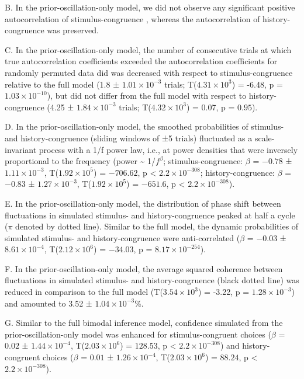 \documentclass[
]{article}
\begin{document}
\begin{itemize}
B. In the prior-oscillation-only model, we did not observe any
significant positive autocorrelation of stimulus-congruence , whereas
the autocorrelation of history-congruence was preserved.

C. In the prior-oscillation-only model, the number of consecutive trials
at which true autocorrelation coefficients exceeded the autocorrelation
coefficients for randomly permuted data did was decreased with respect
to stimulus-congruence relative to the full model (1.8 ±
\ensuremath{1.01\times 10^{-3}} trials;
T(\ensuremath{4.31\times 10^{3}}) = -6.48, p =
\(\ensuremath{1.03\times 10^{-10}}\)), but did not differ from the full
model with respect to history-congruence (4.25 ±
\ensuremath{1.84\times 10^{-3}} trials;
T(\ensuremath{4.32\times 10^{3}}) = 0.07, p = \(0.95\)).

D. In the prior-oscillation-only model, the smoothed probabilities of
stimulus- and history-congruence (sliding windows of ±5 trials)
fluctuated as a scale-invariant process with a 1/f power law, i.e., at
power densities that were inversely proportional to the frequency (power
\textasciitilde{} 1/\(f^\beta\); stimulus-congruence: \(\beta\) =
\(-0.78\) ± \(\ensuremath{1.11\times 10^{-3}}\),
T(\(\ensuremath{1.92\times 10^{5}}\)) = \(-706.62\), p < \(\ensuremath{2.2\times 10^{-308}}\);
history-congruence: \(\beta\) = \(-0.83\) ±
\(\ensuremath{1.27\times 10^{-3}}\),
T(\(\ensuremath{1.92\times 10^{5}}\)) = \(-651.6\), p < \(\ensuremath{2.2\times 10^{-308}}\)).

E. In the prior-oscillation-only model, the distribution of phase shift
between fluctuations in simulated stimulus- and history-congruence
peaked at half a cycle (\(\pi\) denoted by dotted line). Similar to the
full model, the dynamic probabilities of simulated stimulus- and
history-congruence were anti-correlated (\(\beta\) = \(-0.03\) ±
\(\ensuremath{8.61\times 10^{-4}}\),
T(\(\ensuremath{2.12\times 10^{6}}\)) = \(-34.03\), p =
\(\ensuremath{8.17\times 10^{-254}}\)).

F. In the prior-oscillation-only model, the average squared coherence
between fluctuations in simulated stimulus- and history-congruence
(black dotted line) was reduced in comparison to the full model
(T(\ensuremath{3.54\times 10^{3}}) = -3.22, p =
\(\ensuremath{1.28\times 10^{-3}}\)) and amounted to 3.52 ±
\ensuremath{1.04\times 10^{-3}}\%.

G. Similar to the full bimodal inference model, confidence simulated
from the prior-oscillation-only model was enhanced for
stimulus-congruent choices (\(\beta\) = \(0.02\) ±
\(\ensuremath{1.44\times 10^{-4}}\),
T(\(\ensuremath{2.03\times 10^{6}}\)) = \(128.53\), p < \(\ensuremath{2.2\times 10^{-308}}\)) and
history-congruent choices (\(\beta\) = \(0.01\) ±
\(\ensuremath{1.26\times 10^{-4}}\),
T(\(\ensuremath{2.03\times 10^{6}}\)) = \(88.24\), p < \(\ensuremath{2.2\times 10^{-308}}\)).


\end{itemize}
\end{document}
